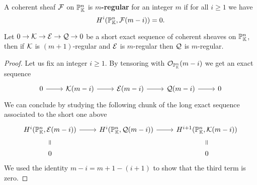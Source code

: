 \begin{definition}
A coherent sheaf $\mathcal{F}$ on $\mathbb{P}^n_{\mathbb{K}}$ is \textbf{$m$-regular} for an integer $m$ if for all $i\geq 1$ we have
\[H^i(\mathbb{P}^n_{\mathbb{K}},\mathcal{F}(m-i))=0.\]
\end{definition}

\begin{lemma}\label{RegularityOnExactSequences}
Let $0\to\mathcal{K}\to\mathcal{E}\to\mathcal{Q}\to 0$ be a short exact sequence of coherent sheaves on $\mathbb{P}^n_{\mathbb{K}}$, then if $\mathcal{K}$ is $(m+1)$-regular and $\mathcal{E}$ is $m$-regular then $\mathcal{Q}$ is $m$-regular.
\end{lemma}
\begin{proof}
Let us fix an integer $i\geq 1$. By tensoring with $\mathcal{O}_{\mathbb{P}^n_{\mathbb{K}}}(m-i)$ we get an exact sequence
\[\begin{tikzcd}
	0 & {\Kc(m-i)} & {\Ec(m-i)} & {\Qc(m-i)} & 0
	\arrow[from=1-1, to=1-2]
	\arrow[from=1-2, to=1-3]
	\arrow[from=1-3, to=1-4]
	\arrow[from=1-4, to=1-5]
\end{tikzcd}\]
We can conclude by studying the following chunk of the long exact sequence associated to the short one above
\[\begin{tikzcd}
	{H^i(\Pj^n_\K,\Ec(m-i))} & {H^i(\Pj^n_\K,\Qc(m-i))} & {H^{i+1}(\Pj^n_\K,\Kc(m-i))} \\
	0 && 0
	\arrow[from=1-1, to=1-2]
	\arrow[from=1-2, to=1-3]
	\arrow["{=}"{marking, allow upside down}, draw=none, from=2-1, to=1-1]
	\arrow["{=}"{marking, allow upside down}, draw=none, from=2-3, to=1-3]
\end{tikzcd}\]
We used the identity $m-i=m+1-(i+1)$ to show that the third term is zero.
\end{proof}

